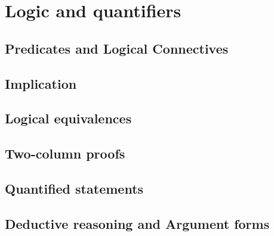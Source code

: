 \chapter{Logic and quantifiers}
\label{ch:logic}

\section{Predicates and Logical Connectives}
\label{sec:pred}




\newpage

\section{Implication}
\label{sec:impl}




\newpage

\section{Logical equivalences}
\label{sec:le}




\newpage
\section{Two-column proofs}
\label{sec:2_col}




\newpage

\section{Quantified statements}
\label{sec:quant}




\newpage

\section{Deductive reasoning and Argument forms}
\label{sec:deduct}

